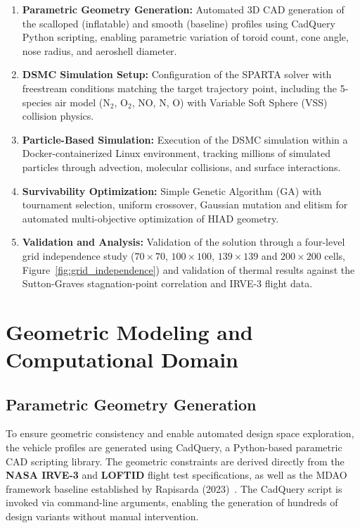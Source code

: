 \begin{enumerate}
    \item \textbf{Parametric Geometry Generation:} Automated 3D CAD generation of the scalloped (inflatable) and smooth (baseline) profiles using CadQuery Python scripting, enabling parametric variation of toroid count, cone angle, nose radius, and aeroshell diameter.
    \item \textbf{DSMC Simulation Setup:} Configuration of the SPARTA solver with freestream conditions matching the target trajectory point, including the 5-species air model (N$_2$, O$_2$, NO, N, O) with Variable Soft Sphere (VSS) collision physics.
    \item \textbf{Particle-Based Simulation:} Execution of the DSMC simulation within a Docker-containerized Linux environment, tracking millions of simulated particles through advection, molecular collisions, and surface interactions.
    \item \textbf{Survivability Optimization:} Simple Genetic Algorithm (GA) with tournament selection, uniform crossover, Gaussian mutation and elitism for automated multi-objective optimization of HIAD geometry.
    \item \textbf{Validation and Analysis:} Validation of the solution through a four-level grid independence study ($70\times70$, $100\times100$, $139\times139$ and $200\times200$ cells, Figure~\ref{fig:grid_independence}) and validation of thermal results against the Sutton-Graves stagnation-point correlation and IRVE-3 flight data.
\end{enumerate}

\section{Geometric Modeling and Computational Domain}

\subsection{Parametric Geometry Generation}
To ensure geometric consistency and enable automated design space exploration, the vehicle profiles are generated using CadQuery, a Python-based parametric CAD scripting library. The geometric constraints are derived directly from the \textbf{NASA IRVE-3} and \textbf{LOFTID} flight test specifications, as well as the MDAO framework baseline established by Rapisarda (2023)~\cite{rapisarda2023mdao}. The CadQuery script is invoked via command-line arguments, enabling the generation of hundreds of design variants without manual intervention.

